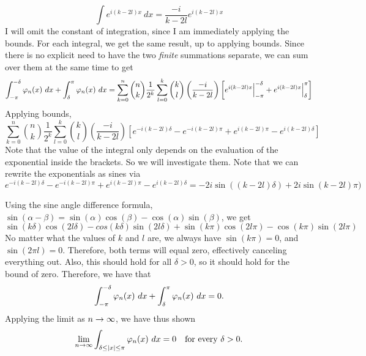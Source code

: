 \begin{solution}
    \[\int e^{i(k - 2l)x} \ dx = \frac{-i}{k - 2l} e^{i(k - 2l)x}\]
    I will omit the constant of integration, since I am immediately applying the bounds. For each integral, we get the same result, up to applying bounds. Since there is no explicit need to have the two \textit{finite} summations separate, we can sum over them at the same time to get
    \[\int_{-\pi}^{-\delta} \varphi_n(x) \ dx + \int_{\delta}^\pi \varphi_n(x) \ dx = \sum_{k = 0}^n {n\choose k} \frac{1}{2^k}\sum_{l = 0}^k {k \choose l}\left(\frac{-i}{k - 2l}\right)\left[ e^{i(k - 2l)x}\Big|_{-\pi}^{-\delta} + e^{i(k - 2l)x}\Big|_{\delta}^\pi\right]\]
    Applying bounds, 
    \[ \sum_{k = 0}^n {n\choose k} \frac{1}{2^k}\sum_{l = 0}^k {k \choose l}\left(\frac{-i}{k - 2l}\right)\left[ e^{-i(k - 2l)\delta} - e^{-i(k - 2l)\pi} + e^{i(k - 2l)\pi} - e^{i(k - 2l)\delta} \right]\]
    Note that the value of the integral only depends on the evaluation of the exponential inside the brackets. So we will investigate them. Note that we can rewrite the exponentials as sines via
    \[e^{-i(k - 2l)\delta} - e^{-i(k - 2l)\pi} + e^{i(k - 2l)\pi} - e^{i(k - 2l)\delta} = -2i\sin((k -2l)\delta) +2i\sin(k - 2l)\pi)\]
    
    Using the sine angle difference formula, $\sin(\alpha -\beta) = \sin(\alpha)\cos(\beta) - \cos(\alpha)\sin(\beta)$, we get
    \[\sin(k\delta)\cos(2l\delta) - cos(k\delta)\sin(2l \delta) + \sin(k\pi)\cos(2l\pi) - \cos(k\pi) \sin(2l\pi)\]
    No matter what the values of $k$ and $l$ are, we always have $\sin(k\pi) = 0$, and $\sin(2\pi l) = 0$. Therefore, both terms will equal zero, effectively canceling everything out. Also, this should hold for all $\delta > 0$, so  it should hold for the bound of zero. Therefore, we have that 
    \[\int_{-\pi}^{-\delta} \varphi_n(x) \ dx + \int_{\delta}^\pi \varphi_n(x) \ dx = 0.\]
    Applying the limit as $n \rightarrow \infty$, we have thus shown  
    \[\lim_{n\rightarrow \infty} \int_{\delta \leq |x| \leq \pi} \varphi_n (x) \ dx = 0 \quad \text {for every } \delta > 0.\]
\end{solution}


\newpage
